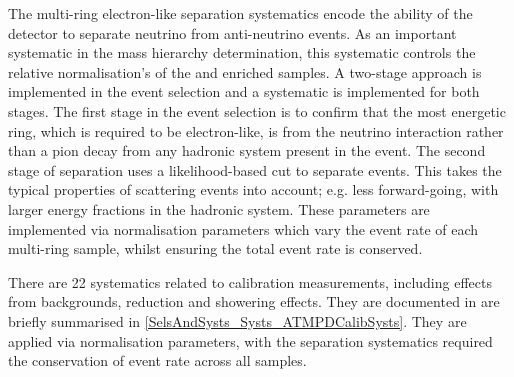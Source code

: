The multi-ring electron-like separation systematics encode the ability of the detector to separate neutrino from anti-neutrino events. As an important systematic in the mass hierarchy determination, this systematic controls the relative normalisation's of the  and  enriched samples. A two-stage approach is implemented in the event selection and a systematic is implemented for both stages. The first stage in the event selection is to confirm that the most energetic ring, which is required to be electron-like, is from the neutrino interaction rather than a pion decay from any hadronic system present in the event. The second stage of separation uses a likelihood-based cut to separate  events. This takes the typical properties of  scattering events into account; e.g. less forward-going, with larger energy fractions in the hadronic system. These parameters are implemented via normalisation parameters which vary the event rate of each multi-ring sample, whilst ensuring the total event rate is conserved.

There are 22 systematics related to calibration measurements, including effects from backgrounds, reduction and showering effects. They are documented in \cite{Jiang2019-iw} are briefly summarised in \autoref{SelsAndSysts_Systs_ATMPDCalibSysts}. They are applied via normalisation parameters, with the separation systematics required the conservation of event rate across all samples.

